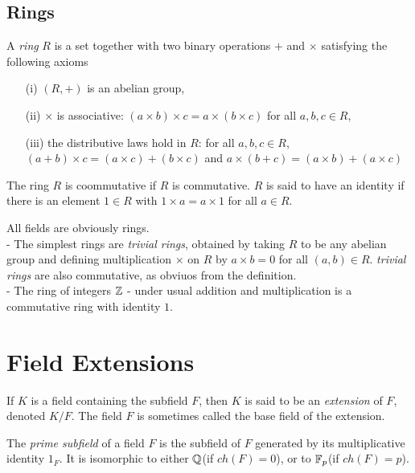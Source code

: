 \subsection{Rings}

\begin{definition}
  A \textit{ring} $R$ is a set together with two binary operations $+$ and $\times$ satisfying
  the following axioms

  \begin{itemize}
    \item[(i)] $(R,+)$ is an abelian group,
    \item[(ii)] $\times$ is associative: $(a\times b)\times c=a\times(b\times c)$ for all $a,b,c\in R$,
    \item[(iii)] the distributive laws hold in $R$: for all $a,b,c\in R$,
        $(a+b)\times c=(a\times c)+(b\times c)$ and $a\times(b+c)=(a\times b)+(a\times c)$
  \end{itemize}

  The ring $R$ is coommutative if $R$ is commutative. $R$ is said to have an identity if there
  is an element $1\in R$ with $1\times a=a\times 1$ for all $a\in R$. \cite{dummit}
\end{definition}

\begin{ex}
  All fields are obviously rings.\\
   - The simplest rings are \textit{trivial rings}, obtained by taking $R$ to be any abelian
  group and defining multiplication $\times$ on $R$ by $a\times b=0$ for all $(a,b)\in R$.
  \textit{trivial rings} are also commutative, as obviuos from the definition.\\
   - The ring of integers $\mathbb{Z}$ - under usual addition and multiplication is a commutative ring
  with identity $1$.
\end{ex}

\section{Field Extensions}

\begin{definition}
  If $K$ is a field containing the subfield $F$, then $K$ is said to be an \textit{extension} of
  $F$, denoted $K/F$. The field $F$ is sometimes called the base field of the extension.
  \cite{dummit}
\end{definition}

\begin{definition}
  The \textit{prime subfield} of a field $F$ is the subfield of $F$ generated by its
  multiplicative identity $1_F$. It is isomorphic to either $\mathbb{Q}$(if $ch(F)=0$), or to
  $\mathbb{F}_p$(if $ch(F)=p$). \cite{dummit}
\end{definition}

